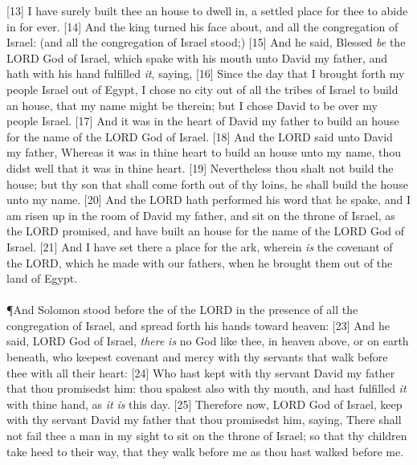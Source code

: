 [13] \textcolor[cmyk]{0.99998,1,0,0}{I have surely built thee an house to dwell in, a settled place for thee to abide in for ever.}
[14] \textcolor[cmyk]{0.99998,1,0,0}{And the king turned his face about, and  all the congregation of Israel: (and all the congregation of Israel stood;)}
[15] \textcolor[cmyk]{0.99998,1,0,0}{And he said, Blessed \emph{be} the LORD God of Israel, which spake with his mouth unto David my father, and hath with his hand fulfilled \emph{it}, saying,}
[16] \textcolor[cmyk]{0.99998,1,0,0}{Since the day that I brought forth my people Israel out of Egypt, I chose no city out of all the tribes of Israel to build an house, that my name might be therein; but I chose David to be over my people Israel.}
[17] \textcolor[cmyk]{0.99998,1,0,0}{And it was in the heart of David my father to build an house for the name of the LORD God of Israel.}
[18] \textcolor[cmyk]{0.99998,1,0,0}{And the LORD said unto David my father, Whereas it was in thine heart to build an house unto my name, thou didst well that it was in thine heart.}
[19] \textcolor[cmyk]{0.99998,1,0,0}{Nevertheless thou shalt not build the house; but thy son that shall come forth out of thy loins, he shall build the house unto my name.}
[20] \textcolor[cmyk]{0.99998,1,0,0}{And the LORD hath performed his word that he spake, and I am risen up in the room of David my father, and sit on the throne of Israel, as the LORD promised, and have built an house for the name of the LORD God of Israel.}
[21] \textcolor[cmyk]{0.99998,1,0,0}{And I have set there a place for the ark, wherein \emph{is} the covenant of the LORD, which he made with our fathers, when he brought them out of the land of Egypt.}\\
\\
\P \textcolor[cmyk]{0.99998,1,0,0}{And Solomon stood before the  of the LORD in the presence of all the congregation of Israel, and spread forth his hands toward heaven:}
[23] \textcolor[cmyk]{0.99998,1,0,0}{And he said, LORD God of Israel, \emph{there} \emph{is} no God like thee, in heaven above, or on earth beneath, who keepest covenant and mercy with thy servants that walk before thee with all their heart:}
[24] \textcolor[cmyk]{0.99998,1,0,0}{Who hast kept with thy servant David my father that thou promisedst him: thou spakest also with thy mouth, and hast fulfilled \emph{it} with thine hand, as \emph{it} \emph{is} this day.}
[25] \textcolor[cmyk]{0.99998,1,0,0}{Therefore now, LORD God of Israel, keep with thy servant David my father that thou promisedst him, saying, There shall not fail thee a man in my sight to sit on the throne of Israel; so that thy children take heed to their way, that they walk before me as thou hast walked before me.}
